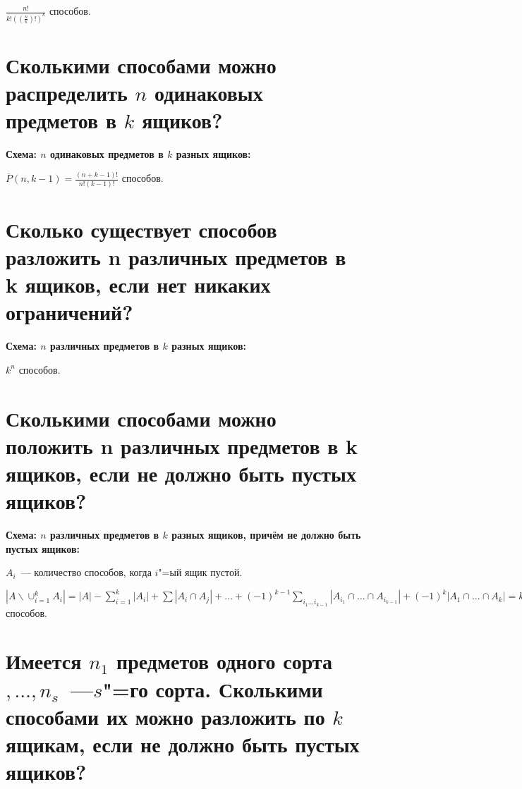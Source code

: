    \begin{center}
        $\frac{n!}{k!((\frac{n}{k})!)^{k}}$ способов.
    \end{center}

\section{Сколькими способами можно распределить $n$ одинаковых предметов в $k$ ящиков?}    

\textbf{Схема: $n$ одинаковых предметов в $k$ разных ящиков:}
    \smallskip

    \begin{center}
        $\overline{P}(n, k-1) = \frac{(n + k - 1)!}{n!(k - 1)!}$ способов.
    \end{center}

\section{Сколько существует способов разложить n различных  предметов в k ящиков, если 
нет никаких ограничений?}    

\textbf{Схема: $n$ различных предметов в $k$ разных ящиков:}
    \smallskip

\begin{center}
    $k^n$ способов.
\end{center}

\section{Сколькими способами можно положить  n различных предметов в k ящиков, если 
не должно быть пустых ящиков?}

\textbf{Схема: $n$ различных предметов в $k$ разных ящиков, причём не должно
быть пустых ящиков:}
    \smallskip

\begin{center}
    $A_i$~--- количество способов, когда $i$"=ый ящик пустой.
    \bigskip

    $|A \backslash \cup^{k}_{i = 1} A_i| = |A| - \sum^{k}_{i = 1} |A_i| + \sum |A_i \cap A_j| +
    \dots + (-1)^{k - 1} \sum_{i_1 \dots i_{k - 1}} |A_{i_1} \cap \dots \cap A_{i_{k - 1}}| +
    (-1)^{k} |A_1 \cap \dots \cap A_k| = k^n - C^1_k (k - 1)^n + C^2_k(k - 2)^n +
    \dots + (-1)^{k - 1} C^{k - 1}_k \cdot 1^n$ способов.
\end{center}

\section{Имеется $n_1$ предметов одного сорта$, \dots, n_s$~---$s$"=го сорта.
Сколькими способами их можно разложить по $k$ ящикам, если не должно быть
пустых ящиков?}

